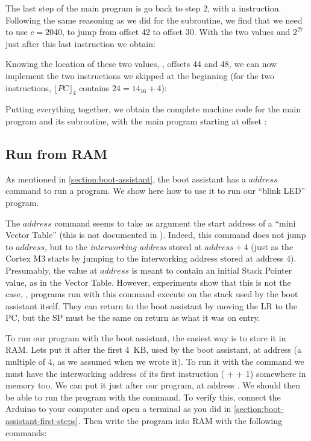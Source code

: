 
The last step of the main program is go back to step 2, with a 
instruction. Following the same reasoning as we did for the subroutine, we find
that we need to use $c=2040$, to jump from offset 42 to offset 30. With the two
values  and $2^{27}$ just after this last instruction we
obtain:


Knowing the location of these two values, \ie, offsets 44 and 48, we can now
implement the two  instructions we skipped at the beginning (for the
two  instructions, $\lfloor PC \rfloor_4$ contains $24=14_{16}+4$):


Putting everything together, we obtain the complete machine code for the main
program and its subroutine, with the main program starting at offset :


\subsection{Run from RAM}\label{subsection:blink-led-boot-assistant}

As mentioned in \cref{section:boot-assistant}, the boot assistant has a
$address$\code{\#} command to run a program. We show here how to use it
to run our ``blink LED'' program.

The $address$\code{\#} command seems to take as argument the start
address of a ``mini Vector Table'' (this is not documented in \cite{SAM3X8E}).
Indeed, this command does not jump to $address$, but to the {\em interworking
address} stored at $address+4$ (just as the Cortex M3 starts by jumping to the
interworking address stored at address $4$). Presumably, the value at $address$
is meant to contain an initial Stack Pointer value, as in the Vector Table.
However, experiments show that this is not the case, \ie, programs run with
this command execute on the stack used by the boot assistant itself. They can
return to the boot assistant by moving the LR to the PC, but the SP must be the
same on return as what it was on entry.

To run our program with the boot assistant, the easiest way is to store it in
RAM. Lets put it after the first 4~KB, used by the boot assistant, at address
 (a multiple of 4, as we assumed when we wrote it). To run it
with the  command we must have the interworking address of its first
instruction ( +  + 1) somewhere in memory too. We can
put it just after our program, at address . We should then be
able to run the program with the  command. To verify this,
connect the Arduino to your computer and open a terminal as you did in
\cref{section:boot-assistant-first-steps}. Then write the program into RAM with
the following commands:


